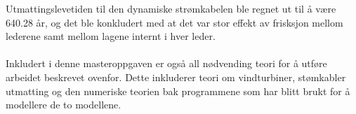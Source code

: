 Utmattingslevetiden til den dynamiske strømkabelen ble regnet ut til å være 640.28 år, og det ble konkludert med at det var stor effekt av frisksjon mellom lederene samt mellom lagene internt i hver leder. \\\\
Inkludert i denne masteroppgaven er også all nødvending teori for å utføre arbeidet beskrevet ovenfor. Dette inkluderer teori om vindturbiner, stømkabler utmatting og den numeriske teorien bak programmene som har blitt brukt for å modellere de to modellene. 